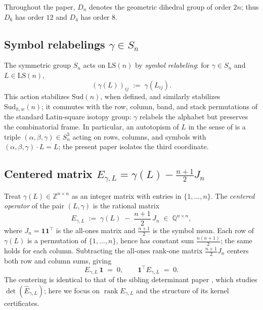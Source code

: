 \documentclass[11pt,a4paper]{article}
\theoremstyle{definition}
\theoremstyle{remark}
\providecommand{\one}{\mathbf{1}}
\providecommand{\Z}{\mathbb{Z}}
\providecommand{\Q}{\mathbb{Q}}
\providecommand{\rank}{\operatorname{rank}}
\newcommand{\Egamma}{E_{\gamma,L}}
\begin{document}
Throughout the paper, $D_n$ denotes the geometric dihedral group of
order $2n$; thus $D_6$ has order $12$ and $D_4$ has order $8$.

\subsection{\texorpdfstring{Symbol relabelings $\gamma \in S_n$}{Symbol relabelings in Sn}}
\label{sec:setup-relabel}

The symmetric group $S_n$ acts on $\mathrm{LS}(n)$ by \emph{symbol
relabeling}: for $\gamma \in S_n$ and $L \in \mathrm{LS}(n)$,
\begin{equation}\label{eq:gamma-action}
   (\gamma(L))_{ij} \;:=\; \gamma(L_{ij}).
\end{equation}
This action stabilizes $\mathrm{Sud}(n)$, when defined, and similarly
stabilizes $\mathrm{Sud}_{h,w}(n)$; it commutes with the row,
column, band, and stack permutations of the standard Latin-square
isotopy group: $\gamma$ relabels the alphabet but preserves the
combinatorial frame. In particular, an autotopism of $L$ in the sense
of \cite{SVW12,AutotopismsPartialLatin20} is a triple
$(\alpha, \beta, \gamma) \in S_n^3$ acting on rows, columns, and
symbols with $(\alpha, \beta, \gamma) \cdot L = L$; the present paper
isolates the third coordinate.

\subsection{\texorpdfstring{Centered matrix $\Egamma = \gamma(L) - \tfrac{n+1}{2}J_n$}{Centered matrix E-gamma}}
\label{sec:setup-Egamma}

Treat $\gamma(L) \in \Z^{n \times n}$ as an integer matrix with entries
in $\{1,\dots,n\}$. The \emph{centered operator} of the pair
$(L, \gamma)$ is the rational matrix
\begin{equation}\label{eq:Egamma-def}
   \Egamma \;:=\; \gamma(L) \;-\; \frac{n+1}{2}\, J_n
   \;\in\; \Q^{n \times n},
\end{equation}
where $J_n = \one \one^{\!\top}$ is the all-ones matrix and
$\frac{n+1}{2}$ is the symbol mean. Each row of $\gamma(L)$ is a
permutation of $\{1,\dots,n\}$, hence has constant sum
$\frac{n(n+1)}{2}$; the same holds for each column. Subtracting the
all-ones rank-one matrix $\frac{n+1}{2} J_n$ centers both row and
column sums, giving
\begin{equation}\label{eq:Egamma-center}
   \Egamma \, \one \;=\; 0,
   \qquad
   \one^{\!\top} \Egamma \;=\; 0.
\end{equation}
The centering is identical to that of the sibling determinant paper
\cite{HAN-DetDivisibility}, which studies $\det(\widehat E_{\gamma,L})$;
here we focus on $\rank \Egamma$ and the structure of its kernel
certificates.
\end{document}
